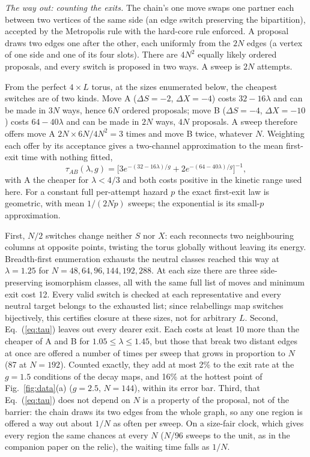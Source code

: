 \documentclass[aps,pre,10pt,twocolumn,superscriptaddress,nofootinbib]{revtex4-2}
\begin{document}
\emph{The way out: counting the exits.} The chain's one move swaps one partner each between two vertices of
the same side (an edge switch preserving the bipartition), accepted by the Metropolis rule with the
hard-core rule enforced. A proposal draws two edges one after the other, each uniformly from the $2N$
edges (a vertex of one side and one of its four slots). There are $4N^2$ equally likely ordered
proposals, and every switch is proposed in two ways. A sweep is $2N$ attempts.

From the perfect $4\times L$ torus, at the sizes enumerated below, the cheapest switches are of two
kinds. Move A ($\Delta S=-2$, $\Delta X=-4$) costs $32-16\lambda$ and can be made in $3N$ ways, hence
$6N$ ordered proposals; move B ($\Delta S=-4$, $\Delta X=-10$) costs $64-40\lambda$ and can be made in
$2N$ ways, $4N$ proposals. A sweep therefore offers move A $2N\times6N/4N^2=3$ times and move B twice,
whatever $N$. Weighting each offer by its acceptance gives a two-channel approximation to the mean
first-exit time with nothing fitted,
\begin{equation}
\tau_{AB}(\lambda, g) = \bigl[3 e^{-(32 - 16\lambda)/g} + 2 e^{-(64-40\lambda)/g}\bigr]^{-1},
\label{eq:tau}
\end{equation}
with A the cheaper for $\lambda<4/3$ and both costs positive in the kinetic range used here. For a
constant full per-attempt hazard $p$ the exact first-exit law is geometric, with mean $1/(2Np)$
sweeps; the exponential is its small-$p$ approximation.

First, $N/2$ switches change neither $S$ nor $X$: each reconnects two
neighbouring columns at opposite points, twisting the torus globally without leaving its energy.
Breadth-first enumeration exhausts the neutral classes reached this way at $\lambda=1.25$ for
$N=48,64,96,144,192,288$. At each size there are three side-preserving isomorphism classes, all with
the same full list of moves and minimum exit cost 12. Every valid switch is checked at each
representative and every neutral target belongs to the exhausted list; since relabellings map switches
bijectively, this certifies closure at these sizes, not for arbitrary $L$. Second,
Eq.~(\ref{eq:tau}) leaves out every dearer exit. Each costs at least 10 more than the cheaper of A and
B for $1.05\le\lambda\le1.45$, but those that break two distant edges at once are offered a number of
times per sweep that grows in proportion to $N$ (87 at $N=192$). Counted exactly, they add at most
2\% to the exit rate at the $g=1.5$ conditions of the decay maps, and 16\% at the hottest point of
Fig.~\ref{fig:data}(a) ($g=2.5$, $N=144$), within its error bar. Third, that Eq.~(\ref{eq:tau}) does
not depend on $N$ is a property of the proposal, not of the barrier: the chain draws its two edges
from the whole graph, so any one region is offered a way out about $1/N$ as often per sweep. On a
size-fair clock, which gives every region the same chances at every $N$ ($N/96$ sweeps to the unit, as
in the companion paper on the relic), the waiting time falls as $1/N$.
\end{document}
